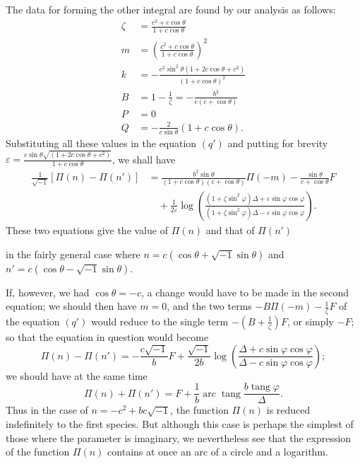 \documentclass{article}
\begin{document}
The data for forming the other integral are found by our analysis as follows:
\[ \begin{aligned} \zeta&=\frac{c^{2}+c\cos\theta}{1+c\cos\theta}\\ m&=\left(\frac{c^{2}+c\cos\theta}{1+c\cos\theta}\right)^{2}\\ k&=-\frac{c^{2}\sin^{2}\theta(1+2c\cos\theta+c^{2})}{(1+c\cos\theta)^{2}}\\ B&=1-\frac{1}{\zeta}=-\frac{b^{2}}{c(c+\cos\theta)}\\ P&=0\\ Q&=-\frac{2}{c\sin\theta}(1+c\cos\theta). \end{aligned} \]
Substituting all these values in the equation $(q')$ and putting for brevity $\varepsilon=\frac{c\sin\theta\sqrt{(1+2c\cos\theta+c^{2})}}{1+c\cos\theta}$, we shall have
\[ \begin{aligned} \frac{1}{\sqrt{-1}}[\Pi(n)-\Pi(n')]&=\frac{b^{2}\sin\theta}{(1+c\cos\theta)(c+\cos\theta)}\Pi(-m)-\frac{\sin\theta}{c+\cos\theta}F\\ &\quad+\frac{1}{2\varepsilon}\log\left(\frac{(1+\zeta\sin^{2}\varphi)\Delta+\varepsilon\sin\varphi\cos\varphi}{(1+\zeta\sin^{2}\varphi)\Delta-\varepsilon\sin\varphi\cos\varphi}\right). \end{aligned} \]
These two equations give the value of $\Pi(n)$ and that of $\Pi(n')$

in the fairly general case where $n=c(\cos\theta+\sqrt{-1}\sin\theta)$ and $n'=c(\cos\theta-\sqrt{-1}\sin\theta)$.

If, however, we had $\cos\theta=-c$, a change would have to be made in the second equation; we should then have $m=0$, and the two terms $-B\Pi(-m)-\frac{1}{\zeta}F$ of the equation $(q')$ would reduce to the single term $-\left(B+\frac{1}{\zeta}\right)F$, or simply $-F$; so that the equation in question would become
\[ \Pi(n)-\Pi(n')=-\frac{c\sqrt{-1}}{b}F+\frac{\sqrt{-1}}{2b}\log\left(\frac{\Delta+c\sin\varphi\cos\varphi}{\Delta-c\sin\varphi\cos\varphi}\right); \]
we should have at the same time
\[ \Pi(n)+\Pi(n')=F+\frac{1}{b}\operatorname{arc}\operatorname{tang}\frac{b\operatorname{tang}\varphi}{\Delta}. \]
Thus in the case of $n=-c^{2}+bc\sqrt{-1}$, the function $\Pi(n)$ is reduced indefinitely to the first species. But although this case is perhaps the simplest of those where the parameter is imaginary, we nevertheless see that the expression of the function $\Pi(n)$ contains at once an arc of a circle and a logarithm.
\end{document}
